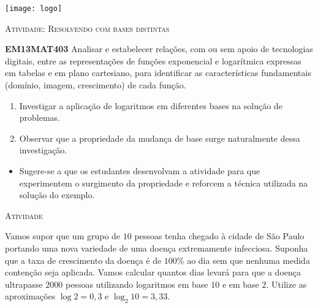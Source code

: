 \documentclass[10 pt,usenames,dvipsnames, oneside]{article}
\begin{document}
\begin{center}
  \begin{minipage}[l]{3cm}
\texttt{[image: logo]}    
\end{minipage}\hfill
\begin{minipage}[r]{.8\textwidth}
 {\Large \scshape Atividade: Resolvendo com bases distintas}  
\end{minipage}
\end{center}
\vspace{.2cm}

\ifdefined\prof
\begin{objetivos}
\item \textbf{EM13MAT403} Analisar e estabelecer relações, com ou sem apoio de tecnologias digitais, entre as representações de funções exponencial e logarítmica expressas em tabelas e em plano cartesiano, para identificar as características fundamentais (domínio, imagem, crescimento) de cada função.
\end{objetivos}

\begin{goals}
\begin{enumerate}
\item Investigar a aplicação de logaritmos em diferentes bases na solução de problemas.
\item Observar que a propriedade da mudança de base surge naturalmente dessa investigação.
\end{enumerate}

\tcblower

\begin{itemize}
\item Sugere-se a que os estudantes desenvolvam a atividade para que experimentem o surgimento da propriedade e reforcem a técnica utilizada na solução do exemplo.
\end{itemize}
\end{goals}

\bigskip
\begin{center}
{\large \scshape Atividade}
\end{center}
\fi

Vamos supor que um grupo de $10$ pessoas tenha chegado à cidade de São Paulo portando uma nova variedade de uma doença extremamente infecciosa. Suponha que a taxa de crescimento da doença é de $100\%$ ao dia sem que nenhuma medida contenção seja aplicada. Vamos calcular quantos dias levará para que a doença ultrapasse $2000$ pessoas utilizando logaritmos em base $10$ e em base $2$. Utilize as aproximações $\log 2 = 0{,}3$ e $\log_2 10 = 3{,}33$.
\end{document}
